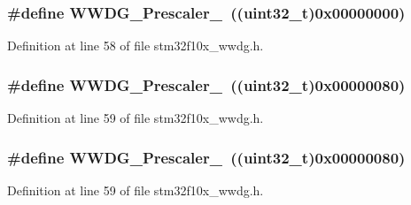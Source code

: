 \subsubsection[{\texorpdfstring{W\+W\+D\+G\+\_\+\+Prescaler\+\_\+1}{WWDG_Prescaler_1}}]{\setlength{\rightskip}{0pt plus 5cm}\#define W\+W\+D\+G\+\_\+\+Prescaler\+\_~(({\bf uint32\+\_\+t})0x00000000)}\hypertarget{group___w_w_d_g___prescaler_ga55780dcf60a252724f5aae2ca37d91c5}{}\label{group___w_w_d_g___prescaler_ga55780dcf60a252724f5aae2ca37d91c5}


Definition at line 58 of file stm32f10x\+\_\+wwdg.\+h.

\subsubsection[{\texorpdfstring{W\+W\+D\+G\+\_\+\+Prescaler\+\_\+2}{WWDG_Prescaler_2}}]{\setlength{\rightskip}{0pt plus 5cm}\#define W\+W\+D\+G\+\_\+\+Prescaler\+\_~(({\bf uint32\+\_\+t})0x00000080)}\hypertarget{group___w_w_d_g___prescaler_ga2ac67d0a7f8691b5ebf0d7d77d6b5f08}{}\label{group___w_w_d_g___prescaler_ga2ac67d0a7f8691b5ebf0d7d77d6b5f08}


Definition at line 59 of file stm32f10x\+\_\+wwdg.\+h.

\subsubsection[{\texorpdfstring{W\+W\+D\+G\+\_\+\+Prescaler\+\_\+2}{WWDG_Prescaler_2}}]{\setlength{\rightskip}{0pt plus 5cm}\#define W\+W\+D\+G\+\_\+\+Prescaler\+\_~(({\bf uint32\+\_\+t})0x00000080)}\hypertarget{group___w_w_d_g___prescaler_ga2ac67d0a7f8691b5ebf0d7d77d6b5f08}{}\label{group___w_w_d_g___prescaler_ga2ac67d0a7f8691b5ebf0d7d77d6b5f08}


Definition at line 59 of file stm32f10x\+\_\+wwdg.\+h.

